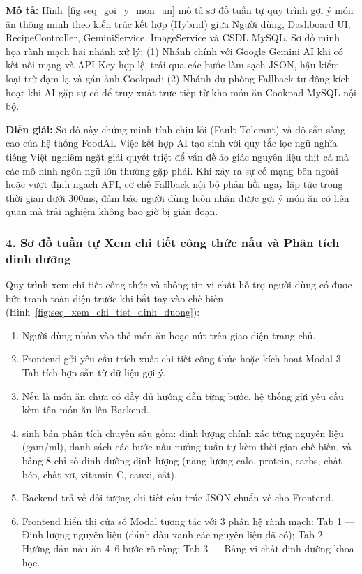 \noindent\textbf{Mô tả:} Hình~\ref{fig:seq_goi_y_mon_an} mô tả sơ đồ tuần tự quy trình gợi ý món ăn thông minh theo kiến trúc kết hợp (Hybrid) giữa Người dùng, Dashboard UI, RecipeController, GeminiService, ImageService và CSDL MySQL. Sơ đồ minh họa rành mạch hai nhánh xử lý: (1) Nhánh chính với Google Gemini AI khi có kết nối mạng và API Key hợp lệ, trải qua các bước làm sạch JSON, hậu kiểm loại trừ đạm lạ và gán ảnh Cookpad; (2) Nhánh dự phòng Fallback tự động kích hoạt khi AI gặp sự cố để truy xuất trực tiếp từ kho món ăn Cookpad MySQL nội bộ.

\noindent\textbf{Diễn giải:} Sơ đồ này chứng minh tính chịu lỗi (Fault-Tolerant) và độ sẵn sàng cao của hệ thống FoodAI. Việc kết hợp AI tạo sinh với quy tắc lọc ngữ nghĩa tiếng Việt nghiêm ngặt giải quyết triệt để vấn đề ảo giác nguyên liệu thịt cá mà các mô hình ngôn ngữ lớn thường gặp phải. Khi xảy ra sự cố mạng bên ngoài hoặc vượt định ngạch API, cơ chế Fallback nội bộ phản hồi ngay lập tức trong thời gian dưới 300ms, đảm bảo người dùng luôn nhận được gợi ý món ăn có liên quan mà trải nghiệm không bao giờ bị gián đoạn.

\subsubsection{4. Sơ đồ tuần tự Xem chi tiết công thức nấu và Phân tích dinh dưỡng}

Quy trình xem chi tiết công thức và thông tin vi chất hỗ trợ người dùng có được bức tranh toàn diện trước khi bắt tay vào chế biến (Hình~\ref{fig:seq_xem_chi_tiet_dinh_duong}):
\begin{enumerate}[leftmargin=1.6em, itemsep=2pt]
  \item Người dùng nhấn vào thẻ món ăn hoặc nút  trên giao diện trang chủ.
  \item Frontend gửi yêu cầu trích xuất chi tiết công thức hoặc kích hoạt Modal 3 Tab tích hợp sẵn từ dữ liệu gợi ý.
  \item Nếu là món ăn chưa có đầy đủ hướng dẫn từng bước, hệ thống gửi yêu cầu  kèm tên món ăn lên Backend.
  \item {} sinh bản phân tích chuyên sâu gồm: định lượng chính xác từng nguyên liệu (gam/ml), danh sách các bước nấu nướng tuần tự kèm thời gian chế biến, và bảng 8 chỉ số dinh dưỡng định lượng (năng lượng calo, protein, carbs, chất béo, chất xơ, vitamin C, canxi, sắt).
  \item Backend trả về đối tượng chi tiết cấu trúc JSON chuẩn về cho Frontend.
  \item Frontend hiển thị cửa sổ Modal tương tác với 3 phân hệ rành mạch: Tab 1 --- Định lượng nguyên liệu (đánh dấu xanh các nguyên liệu đã có); Tab 2 --- Hướng dẫn nấu ăn 4--6 bước rõ ràng; Tab 3 --- Bảng vi chất dinh dưỡng khoa học.
\end{enumerate}

